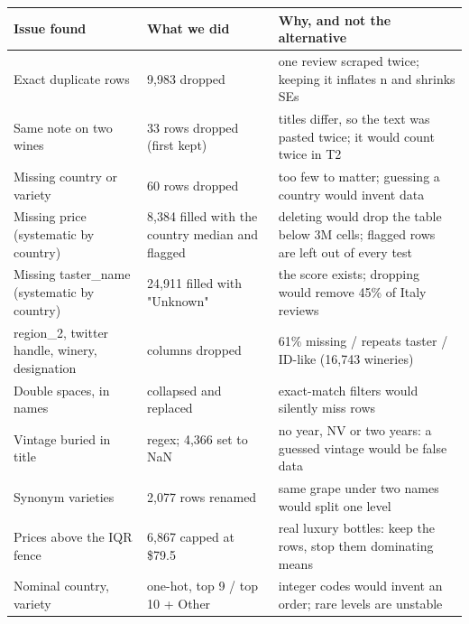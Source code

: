 \begin{tabular}{lll}
\toprule
\textbf{Issue found} & \textbf{What we did} & \textbf{Why, and not the alternative} \\
\midrule
Exact duplicate rows & 9,983 dropped & one review scraped twice; keeping it inflates n and shrinks SEs \\
Same note on two wines & 33 rows dropped (first kept) & titles differ, so the text was pasted twice; it would count twice in T2 \\
Missing country or variety & 60 rows dropped & too few to matter; guessing a country would invent data \\
Missing price (systematic by country) & 8,384 filled with the country median and flagged & deleting would drop the table below 3M cells; flagged rows are left out of every test \\
Missing taster\_name (systematic by country) & 24,911 filled with "Unknown" & the score exists; dropping would remove 45\% of Italy reviews \\
region\_2, twitter handle, winery, designation & columns dropped & 61\% missing / repeats taster / ID-like (16,743 wineries) \\
Double spaces, \xa0 in names & collapsed and replaced & exact-match filters would silently miss rows \\
Vintage buried in title & regex; 4,366 set to NaN & no year, NV or two years: a guessed vintage would be false data \\
Synonym varieties & 2,077 rows renamed & same grape under two names would split one level \\
Prices above the IQR fence & 6,867 capped at \$79.5 & real luxury bottles: keep the rows, stop them dominating means \\
Nominal country, variety & one-hot, top 9 / top 10 + Other & integer codes would invent an order; rare levels are unstable \\
\bottomrule
\end{tabular}
